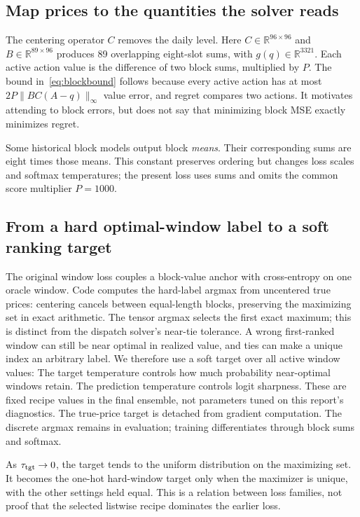\documentclass[11pt,a4paper]{article}
\begin{document}
\subsection{Map prices to the quantities the solver reads}
\EqBlocks
The centering operator $C$ removes the daily level. Here $C\in\mathbb R^{96\times96}$ and $B\in\mathbb R^{89\times96}$ produces 89 overlapping eight-slot sums, with $g(q)\in\mathbb R^{3321}$. Each active action value is the difference of two block sums, multiplied by $P$. The bound in~\eqref{eq:blockbound} follows because every active action has at most $2P\|BC(A-q)\|_\infty$ value error, and regret compares two actions. It motivates attending to block errors, but does not say that minimizing block MSE exactly minimizes regret.

Some historical block models output block \emph{means}. Their corresponding sums are eight times those means. This constant preserves ordering but changes loss scales and softmax temperatures; the present loss uses sums and omits the common score multiplier $P=1000$.

\subsection{From a hard optimal-window label to a soft ranking target}
\EqHardLoss
The original window loss couples a block-value anchor with cross-entropy on one oracle window. Code computes the hard-label argmax from uncentered true prices: centering cancels between equal-length blocks, preserving the maximizing set in exact arithmetic. The tensor argmax selects the first exact maximum; this is distinct from the dispatch solver's near-tie tolerance. A wrong first-ranked window can still be near optimal in realized value, and ties can make a unique index an arbitrary label. We therefore use a soft target over all active window values:
\EqListwise
The target temperature controls how much probability near-optimal windows retain. The prediction temperature controls logit sharpness. These are fixed recipe values in the final ensemble, not parameters tuned on this report's diagnostics. The true-price target is detached from gradient computation. The discrete argmax remains in evaluation; training differentiates through block sums and softmax.

As $\tau_{\rm tgt}\to0$, the target tends to the uniform distribution on the maximizing set. It becomes the one-hot hard-window target only when the maximizer is unique, with the other settings held equal. This is a relation between loss families, not proof that the selected listwise recipe dominates the earlier loss.
\end{document}
